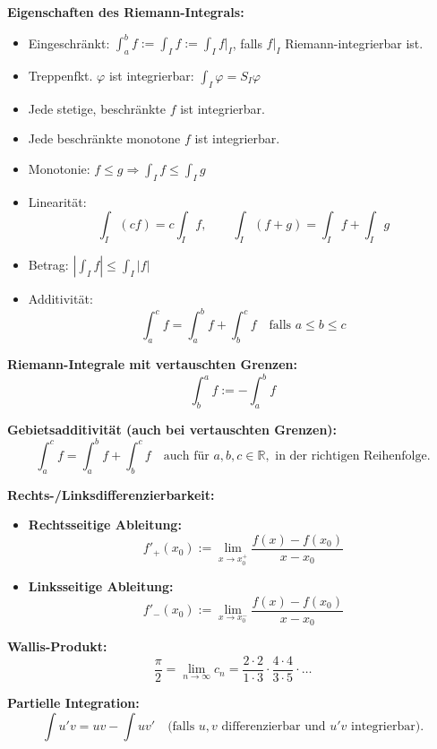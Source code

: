 \textbf{Eigenschaften des Riemann-Integrals:}
\begin{itemize}
  \item Eingeschränkt: \( \int_a^b f := \int_I f := \int_I f|_I \), falls \( f|_I \) Riemann-integrierbar ist.

  \item Treppenfkt. \( \varphi \) ist integrierbar: \( \int_I \varphi = S_I \varphi \)

  \item Jede stetige, beschränkte \( f \) ist integrierbar.

  \item Jede beschränkte monotone \( f \) ist integrierbar.

  \item Monotonie: \( f \le g \Rightarrow \int_I f \le \int_I g \)

  \item Linearität:
  \[
    \int_I (cf) = c \int_I f, \qquad \int_I (f+g) = \int_I f + \int_I g
  \]

  \item Betrag: \( \left| \int_I f \right| \le \int_I |f| \)

  \item Additivität:
  \[
    \int_a^c f = \int_a^b f + \int_b^c f \quad \text{falls } a \le b \le c
  \]
\end{itemize}

\textbf{Riemann-Integrale mit vertauschten Grenzen:}
\[
\int_b^a f := - \int_a^b f
\]

\textbf{Gebietsadditivität (auch bei vertauschten Grenzen):}
\[
\int_a^c f = \int_a^b f + \int_b^c f
\quad \text{auch für } a, b, c \in \mathbb{R}, \text{ in der richtigen Reihenfolge.}
\]

\textbf{Rechts-/Linksdifferenzierbarkeit:}
\begin{itemize}
  \item \textbf{Rechtsseitige Ableitung:}
  \[
  f'_{+}(x_0) := \lim_{x \to x_0^+} \frac{f(x) - f(x_0)}{x - x_0}
  \]
  \item \textbf{Linksseitige Ableitung:}
  \[
  f'_{-}(x_0) := \lim_{x \to x_0^-} \frac{f(x) - f(x_0)}{x - x_0}
  \]
\end{itemize}

\textbf{Wallis-Produkt:}
\[
\frac{\pi}{2} = \lim_{n \to \infty} c_n = \frac{2 \cdot 2}{1 \cdot 3} \cdot \frac{4 \cdot 4}{3 \cdot 5} \cdot \ldots
\]


\textbf{Partielle Integration:}
\[
\int u'v = uv - \int uv'
\quad \text{(falls } u,v \text{ differenzierbar und } u'v \text{ integrierbar).}
\]

